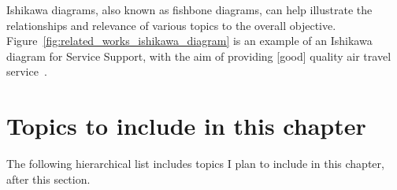 Ishikawa diagrams, also known as fishbone diagrams, can help illustrate the relationships and relevance of various topics to the overall objective. Figure~\ref{fig:related_works_ishikawa_diagram} is an example of an Ishikawa diagram for Service Support, with the aim of providing [good] quality air travel service~\cite{itil_ishikawa_example}. 

\section{Topics to include in this chapter}
The following hierarchical list includes topics I plan to include in this chapter, after this section.


